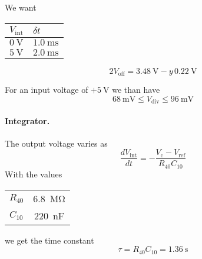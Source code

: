 \documentclass[a4paper]{article}
\begin{document}
We want
\begin{center}
  \begin{tabular}{ll}
    \toprule
    $V_{\text{int}}$ & $\delta t$ \\
    \midrule
    $\SI{0}{\volt}$ & $\SI{1.0}{\milli\second}$ \\
    $\SI{5}{\volt}$ & $\SI{2.0}{\milli\second}$ \\
    \bottomrule
  \end{tabular}
\end{center}


\begin{equation*}
  2 V_{\text{off}} = \SI{3.48}{\volt} - y \, \SI{0.22}{\volt}
\end{equation*}


For an input voltage of $+\SI{5}{\volt}$ we than have
\begin{equation}
  \SI{68}{\milli\volt} \le V_{\text{div}} \le \SI{96}{\milli\volt}
\end{equation}


\paragraph{Integrator.}

\begin{center}
\end{center}
The output voltage varies as
\begin{equation}
  \frac{dV_{\text{int}}}{dt} = -\frac{V_{\text{c}} - V_{\text{ref}}}{R_{40} C_{10}}
\end{equation}
With the values
\begin{center}
  \begin{tabular}{lS}
    \toprule
    $R_{40}$ & \SI{6.8}{\mega\ohm} \\
    $C_{10}$ & \SI{220}{\nano\farad} \\
    \bottomrule
  \end{tabular}
\end{center}
we get the time constant
\begin{equation}
  \tau = R_{40}C_{10} = \SI{1.36}{\second}
\end{equation}
\end{document}
